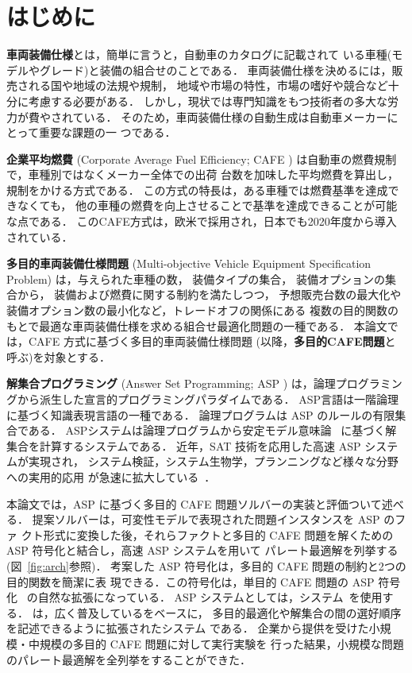 \section{はじめに}\label{sec:introduction}


\textbf{車両装備仕様}とは，簡単に言うと，自動車のカタログに記載されて
いる車種(モデルやグレード)と装備の組合せのことである．
車両装備仕様を決めるには，販売される国や地域の法規や規制，
地域や市場の特性，市場の嗜好や競合など十分に考慮する必要がある．
しかし，現状では専門知識をもつ技術者の多大な労力が費やされている．
そのため，車両装備仕様の自動生成は自動車メーカーにとって重要な課題の一
つである．

\textbf{企業平均燃費}
(Corporate Average Fuel Efficiency; CAFE
\cite{mlit18:cafe})
は自動車の燃費規制で，車種別ではなくメーカー全体での出荷
台数を加味した平均燃費を算出し，規制をかける方式である．
この方式の特長は，ある車種では燃費基準を達成できなくても，
他の車種の燃費を向上させることで基準を達成できることが可能な点である．
このCAFE方式は，欧米で採用され，日本でも2020年度から導入されている．

\textbf{多目的車両装備仕様問題}
(Multi-objective Vehicle Equipment Specification Problem)
は，与えられた車種の数，
装備タイプの集合，
装備オプションの集合から，
装備および燃費に関する制約を満たしつつ，
予想販売台数の最大化や装備オプション数の最小化など，トレードオフの関係にある
複数の目的関数のもとで最適な車両装備仕様を求める組合せ最適化問題の一種である．
本論文では，CAFE 方式に基づく多目的車両装備仕様問題
(以降，\textbf{多目的CAFE問題}と呼ぶ)を対象とする．

\textbf{解集合プログラミング}
(Answer Set Programming; ASP
\cite{Gelfond88:iclp,Inoue08:jssst})
は，論理プログラミングから派生した宣言的プログラミングパラダイムである．
ASP言語は一階論理に基づく知識表現言語の一種である．
論理プログラムは ASP のルールの有限集合である．
ASPシステムは論理プログラムから安定モデル意味論~\cite{Gelfond88:iclp}
に基づく解集合を計算するシステムである．
近年，SAT 技術を応用した高速 ASP システムが実現され，
システム検証，システム生物学，プランニングなど様々な分野への実用的応用
が急速に拡大している~\cite{Erdem16:ai-magazine}．

本論文では，ASP に基づく多目的 CAFE 問題ソルバーの実装と評価ついて述べる．
提案ソルバーは，可変性モデルで表現された問題インスタンスを ASP のファ
クト形式に変換した後，それらファクトと多目的 CAFE 問題を解くための ASP
符号化と結合し，高速 ASP システムを用いて
パレート最適解を列挙する(図~\ref{fig:arch}参照)．
%
考案した ASP 符号化は，多目的 CAFE 問題の制約と2つの目的関数を簡潔に表
現できる．この符号化は，単目的 CAFE 問題の ASP 符号化~\cite{Takeuchi20:jssst}
の自然な拡張になっている．
%
ASP システムとしては，{\asprin}システム~\cite{Brewka15:casp}を使用する．
{\asprin}は，広く普及している{\clingo}をベースに，
多目的最適化や解集合の間の選好順序を記述できるように拡張されたシステム
である．
%
企業から提供を受けた小規模・中規模の多目的 CAFE 問題に対して実行実験を
行った結果，小規模な問題のパレート最適解を全列挙をすることができた．

